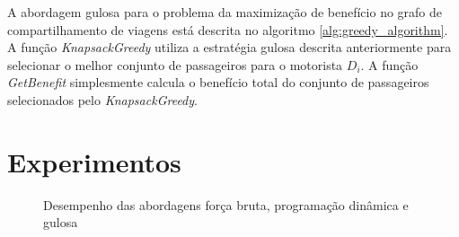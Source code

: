 \documentclass{article}
\begin{document}
A abordagem gulosa para o problema da maximização de benefício no grafo de compartilhamento de viagens está
descrita no algoritmo \ref{alg:greedy_algorithm}. A função \textit{KnapsackGreedy} utiliza a estratégia gulosa descrita anteriormente
para selecionar o melhor conjunto de passageiros para o motorista $ D_i $. A função \textit{GetBenefit} simplesmente
calcula o benefício total do conjunto de passageiros selecionados pelo \textit{KnapsackGreedy}.

\section{Experimentos}


\begin{figure}
\centering
{}
\caption{Desempenho das abordagens força bruta, programação dinâmica e gulosa}
\label{fig:execution_time}
\end{figure}
\end{document}
